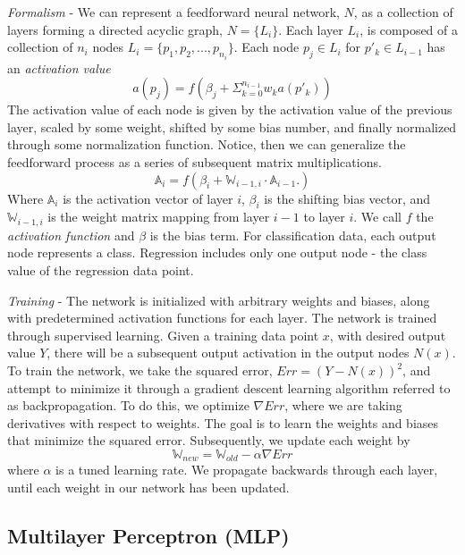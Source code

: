 \documentclass[twoside,11pt]{article}
\begin{document}
\textit{Formalism} - We can represent a feedforward neural network, $N$, as a collection of layers forming a directed acyclic graph, $N=\{L_i\}$. Each layer $L_i$, is composed of a collection of $n_i$ nodes $L_i=\{p_1, p_2, ..., p_{n_i}\}$. Each node $p_j\in L_i$ for $p'_k \in L_{i-1}$ has an \textit{activation value}
\begin{equation}
    a(p_j) =  f(\beta_j + \Sigma_{k=0}^{n_{i-1}}w_ka(p'_k)) 
\end{equation} The activation value of each node is given by the activation value of the previous layer, scaled by some weight, shifted by some bias number, and finally normalized through some normalization function. Notice, then we can generalize the feedforward process as a series of subsequent matrix multiplications.
\begin{equation}
    \mathbb{A}_i= f(\beta_{i} + \mathbb{W}_{i-1,i} \cdot \mathbb{A}_{i-1}.)
\end{equation} Where $\mathbb{A}_i$ is the activation vector of layer $i$, $\beta_i$ is the shifting bias vector, and $\mathbb{W}_{i-1,i}$ is the weight matrix mapping from layer $i-1$ to layer $i$.  We call $f$ the \textit{activation function} and $\beta$ is the bias term. For classification data, each output node represents a class. Regression includes only one output node - the class value of the regression data point.

\textit{Training} - The network is initialized with arbitrary weights and biases, along with predetermined activation functions for each layer. The network is trained through supervised learning. Given a training data point $x$, with desired output value $Y$, there will be a subsequent output activation in the output nodes $N(x)$. To train the network, we take the squared error, $Err=(Y-N(x))^2$, and attempt to minimize it through a gradient descent learning algorithm referred to as backpropagation. To do this, we optimize $\nabla Err$, where we are taking derivatives with respect to weights. The goal is to learn the weights and biases that minimize the squared error. Subsequently, we update each weight by
\begin{equation}
    \mathbb{W}_{new} = \mathbb{W}_{old}-\alpha \nabla Err
\end{equation}where $\alpha$ is a tuned learning rate. We propagate backwards through each layer, until each weight in our network has been updated.

\subsection{Multilayer Perceptron (MLP)}
\end{document}

